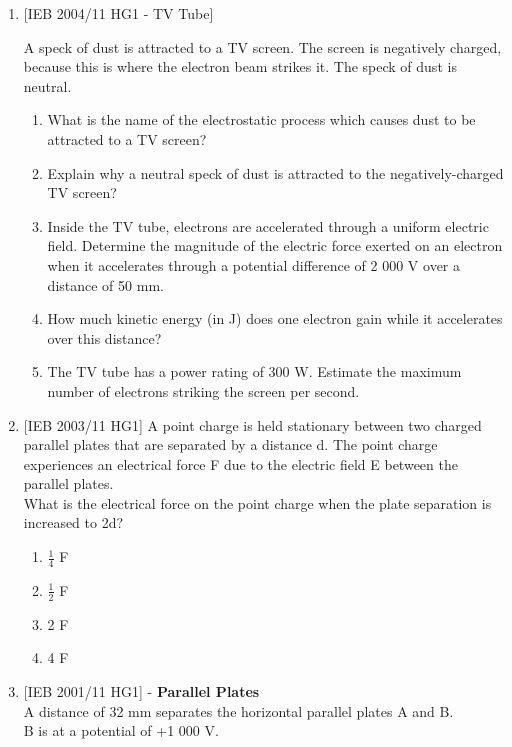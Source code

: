 \begin{enumerate}
\item{[IEB 2004/11 HG1 - TV Tube]

A speck of dust is attracted to a TV screen. The screen is
negatively charged, because this is where the electron beam
strikes it. The speck of dust is neutral.

\begin{enumerate}
\item{What is the name of the electrostatic process which causes dust to be attracted to a TV screen?}
\item{Explain why a neutral speck of dust is attracted to the negatively-charged TV screen?}
\item{Inside the TV tube, electrons are accelerated through a uniform electric field. Determine the magnitude of the electric force exerted on an electron when it accelerates through a potential difference of 2 000 V over a distance of 50 mm.}
\item{How much kinetic energy (in J) does one electron gain while it accelerates over this distance?}
\item{The TV tube has a power rating of 300 W. Estimate the maximum number of electrons striking the screen per second.}
\end{enumerate}}

\item{[IEB 2003/11 HG1] A point charge is held stationary between two charged parallel plates that are separated by a distance d. The point charge experiences an electrical force F due to the electric field E between the parallel plates.\\
 
What is the electrical force on the point charge when the plate
separation is increased to 2d?

\begin{enumerate}
\item{$\tfrac{1}{4}$ F}
\item{$\tfrac{1}{2}$ F}
\item{2 F}
\item{4 F}
\end{enumerate}
}

\item{[IEB 2001/11 HG1] - \textbf{Parallel Plates}\\
 
A distance of 32 mm separates the horizontal parallel plates A and B.\\
B is at a potential of +1 000 V.

}
\end{enumerate}
